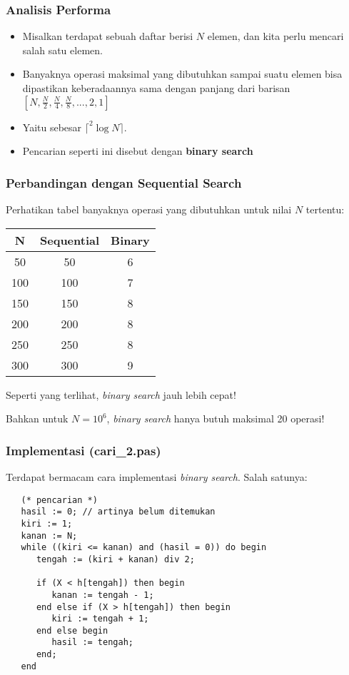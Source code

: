 \documentclass{beamer}
\begin{document}
\begin{frame}
\frametitle{Analisis Performa}
\begin{itemize}
	\item Misalkan terdapat sebuah daftar berisi $N$ elemen, dan kita perlu mencari salah satu elemen. 
	\item Banyaknya operasi maksimal yang dibutuhkan sampai suatu elemen bisa dipastikan keberadaannya sama dengan panjang dari barisan $[N, \frac{N}{2}, \frac{N}{4}, \frac{N}{8}, ..., 2, 1]$
	\item Yaitu sebesar $\lceil ^2\log{N} \rceil$.
	\item Pencarian seperti ini disebut dengan \alert{\textbf{binary search}}
\end{itemize}
\end{frame}

\begin{frame}
\frametitle{Perbandingan dengan Sequential Search}
Perhatikan tabel banyaknya operasi yang dibutuhkan untuk nilai $N$ tertentu:
\begin{table}[ht]
	\begin{tabular}{|c|c|c|}
		\hline N  & Sequential  & Binary \\ 
		\hline 50 & 50 & 6 \\ 
		\hline 100 & 100 & 7 \\
		\hline 150 & 150 & 8 \\
		\hline 200 & 200 & 8 \\
		\hline 250 & 250 & 8 \\
		\hline 300 & 300 & 9 \\
		\hline 
	\end{tabular}
\end{table} 
Seperti yang terlihat, \textit{binary search} jauh lebih cepat!

Bahkan untuk $N = 10^6$, \textit{binary search} hanya butuh maksimal 20 operasi!
\end{frame}

\begin{frame}[fragile]
\frametitle{Implementasi (cari\_2.pas)}
Terdapat bermacam cara implementasi \textit{binary search}. Salah satunya:
\begin{lstlisting}
   (* pencarian *)
   hasil := 0; // artinya belum ditemukan
   kiri := 1;
   kanan := N;
   while ((kiri <= kanan) and (hasil = 0)) do begin
      tengah := (kiri + kanan) div 2;
      
      if (X < h[tengah]) then begin
         kanan := tengah - 1;
      end else if (X > h[tengah]) then begin
         kiri := tengah + 1;
      end else begin
         hasil := tengah;
      end;
   end
\end{lstlisting}
\end{frame}
\end{document}
